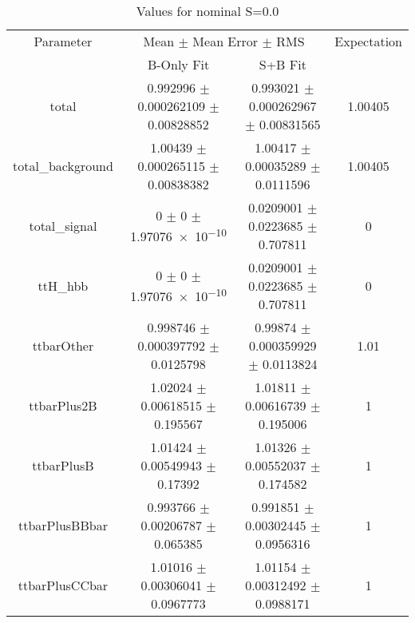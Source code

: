 \begin{table}
\centering
\caption{Values for nominal S=0.0}
\begin{tabular}{cccc}
\toprule
Parameter & \multicolumn{2}{c}{Mean $\pm$ Mean Error $\pm$ RMS} & Expectation\\
 & B-Only Fit & S+B Fit & \\
\midrule
total & \num{0.992996} $\pm$ \num{0.000262109} $\pm$ \num{0.00828852} & \num{0.993021} $\pm$ \num{0.000262967} $\pm$ \num{0.00831565} & \num{1.00405}\\
total\_background & \num{1.00439} $\pm$ \num{0.000265115} $\pm$ \num{0.00838382} & \num{1.00417} $\pm$ \num{0.00035289} $\pm$ \num{0.0111596} & \num{1.00405}\\
total\_signal & \num{0} $\pm$ \num{0} $\pm$ \num{1.97076e-10} & \num{0.0209001} $\pm$ \num{0.0223685} $\pm$ \num{0.707811} & \num{0}\\
ttH\_hbb & \num{0} $\pm$ \num{0} $\pm$ \num{1.97076e-10} & \num{0.0209001} $\pm$ \num{0.0223685} $\pm$ \num{0.707811} & \num{0}\\
ttbarOther & \num{0.998746} $\pm$ \num{0.000397792} $\pm$ \num{0.0125798} & \num{0.99874} $\pm$ \num{0.000359929} $\pm$ \num{0.0113824} & \num{1.01}\\
ttbarPlus2B & \num{1.02024} $\pm$ \num{0.00618515} $\pm$ \num{0.195567} & \num{1.01811} $\pm$ \num{0.00616739} $\pm$ \num{0.195006} & \num{1}\\
ttbarPlusB & \num{1.01424} $\pm$ \num{0.00549943} $\pm$ \num{0.17392} & \num{1.01326} $\pm$ \num{0.00552037} $\pm$ \num{0.174582} & \num{1}\\
ttbarPlusBBbar & \num{0.993766} $\pm$ \num{0.00206787} $\pm$ \num{0.065385} & \num{0.991851} $\pm$ \num{0.00302445} $\pm$ \num{0.0956316} & \num{1}\\
ttbarPlusCCbar & \num{1.01016} $\pm$ \num{0.00306041} $\pm$ \num{0.0967773} & \num{1.01154} $\pm$ \num{0.00312492} $\pm$ \num{0.0988171} & \num{1}\\
\bottomrule
\end{tabular}
\end{table}